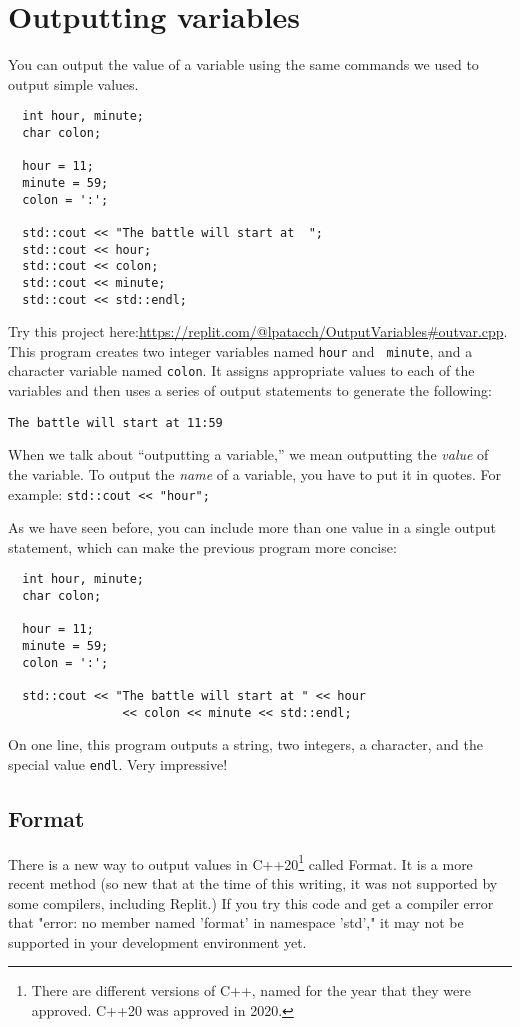 \section{Outputting variables}
\label{output}

You can output the value of a variable using the same commands
we used to output simple values.

\begin{lstlisting}
  int hour, minute;
  char colon;

  hour = 11;
  minute = 59;
  colon = ':';

  std::cout << "The battle will start at  ";
  std::cout << hour;
  std::cout << colon;
  std::cout << minute;
  std::cout << std::endl;
\end{lstlisting}

%
Try this project here:\url{https://replit.com/@lpatacch/OutputVariables#outvar.cpp}.
This program creates two integer variables named {\tt hour} and {\tt
minute}, and a character variable named {\tt colon}.  It assigns
appropriate values to each of the variables and then uses a series
of output statements to generate the following:

\begin{verbatim}
The battle will start at 11:59
\end{verbatim}

When we talk about ``outputting a variable,'' we mean outputting the
{\em value} of the variable.  To output the {\em name} of a variable,
you have to put it in quotes.  For example: {\tt std::cout << "hour";}

As we have seen before, you can include more than one value in
a single output statement, which can make the previous program more
concise:

\begin{lstlisting}
  int hour, minute;
  char colon;

  hour = 11;
  minute = 59;
  colon = ':';

  std::cout << "The battle will start at " << hour 
                << colon << minute << std::endl;
\end{lstlisting}
%
On one line, this program outputs a string, two integers, a character,
and the special value {\tt endl}.  Very impressive!

\subsection{Format}
There is a new way to output values in C++20\footnote{There are different
versions of C++, named for the year that they were approved. C++20 was
approved in 2020.} called Format. It is a
more recent method (so new that at the time of this writing, it was not
supported by some compilers, including Replit.) If 
you try this code and get a compiler error that "error: no member 
named 'format' in namespace 'std'," it may not be supported in your development environment yet.

